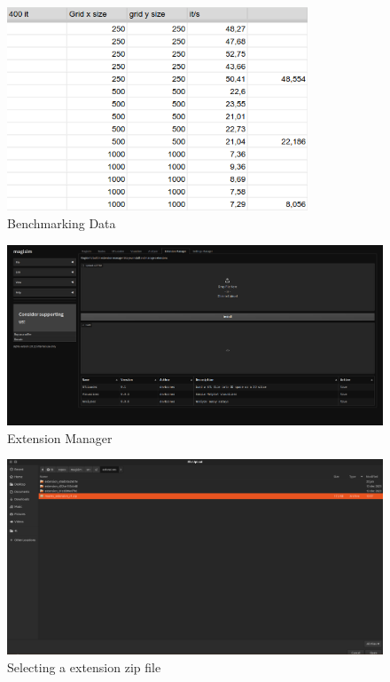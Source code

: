 \documentclass[11pt, a4paper, titlepage]{article}
\begin{document}
\begin{center}
\begin{figure}[h!]
	\includegraphics[width=0.8\textwidth]{benchmarkdata.png}
	\caption{Benchmarking Data}
	\label{fig:benchmarkdata}
\end{figure}
\end{center}
\newpage
\begin{figure}[h]
	\includegraphics[width=\textwidth]{magisim-screenshot-0008.png}
	\caption{Extension Manager}
	\label{fig:exmgr}
\end{figure}
\begin{figure}[h]
	\includegraphics[width=\textwidth]{magisim-screenshot-0009.png}
	\caption{Selecting a extension zip file}
	\label{fig:selexzip}
\end{figure}
\end{document}
